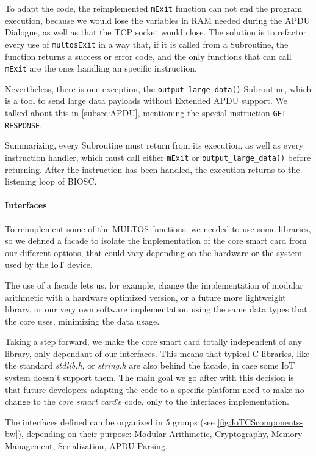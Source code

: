 \documentclass[journal]{IEEEtran}
\begin{document}
To adapt the code, the reimplemented \texttt{mExit} function can not end the program execution, because we would lose the variables in RAM needed during the APDU Dialogue, as well as that the TCP socket would close. The solution is to refactor every use of \texttt{multosExit} in a way that, if it is called from a Subroutine, the function returns a success or error code, and the only functions that can call \texttt{mExit} are the ones handling an specific instruction.

Nevertheless, there is one exception, the \texttt{output\_large\_data()} Subroutine, which is a tool to send large data payloads without Extended APDU support. We talked about this in \ref{subsec:APDU}, mentioning the special instruction \texttt{GET RESPONSE}.

Summarizing, every Subroutine must return from its execution, as well as every instruction handler, which must call either \texttt{mExit} or \texttt{output\_large\_data()} before returning. After the instruction has been handled, the execution returns to the listening loop of BIOSC.



\paragraph{Interfaces}\hfil

To reimplement some of the MULTOS functions, we needed to use some libraries, so we defined a facade to isolate the implementation of the core smart card from our different options, that could vary depending on the hardware or the system used by the IoT device.

The use of a facade lets us, for example, change the implementation of modular arithmetic with a hardware optimized version, or a future more lightweight library, or our very own software implementation using the same data types that the core uses, minimizing the data usage.

Taking a step forward, we make the core smart card totally independent of any library, only dependant of our interfaces. This means that typical C libraries, like the standard \textit{stdlib.h}, or  \textit{string.h} are also behind the facade, in case some IoT system doesn't support them. The main goal we go after with this decision is that future developers adapting the code to a specific platform need to make no change to the \textit{core smart card}'s code, only to the interfaces implementation.

The interfaces defined can be organized in 5 groups (see \autoref{fig:IoTCScomponents-bw}), depending on their purpose: Modular Arithmetic, Cryptography, Memory Management, Serialization, APDU Parsing.
\end{document}
